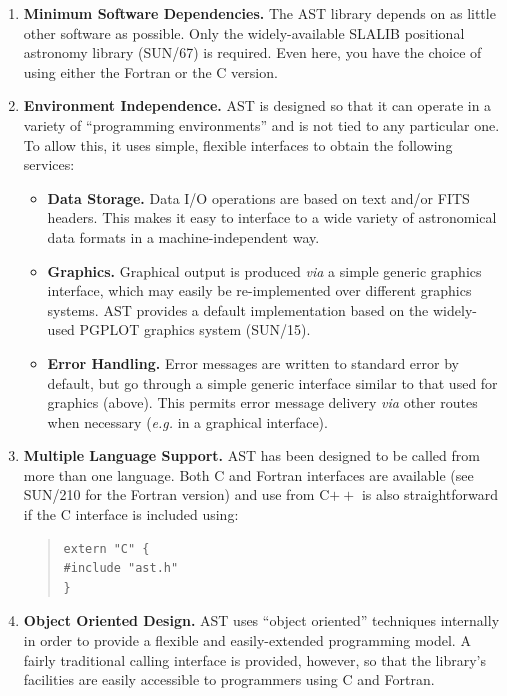 \documentclass[twoside,11pt]{article}
\newcommand{\xref}[3]{#1}
\begin{document}
\begin{enumerate}
\item {\bf{Minimum Software Dependencies.}}
The AST library depends on as little other software as possible. Only
the widely-available SLALIB positional astronomy library
(\xref{SUN/67}{sun67}{}) is required. Even here, you have the choice
of using either the Fortran or the C version.

\item {\bf{Environment Independence.}}
AST is designed so that it can operate in a variety of ``programming
environments'' and is not tied to any particular one. To allow this,
it uses simple, flexible interfaces to obtain the following services:

\begin{itemize}
\item {\bf{Data Storage.}} Data I/O operations are based on text
and/or FITS headers. This makes it easy to interface to a wide variety
of astronomical data formats in a machine-independent way.

\item {\bf{Graphics.}} Graphical output is produced {\em{via}} a
simple generic graphics interface, which may easily be re-implemented
over different graphics systems. AST provides a default implementation
based on the widely-used PGPLOT graphics system
(\xref{SUN/15}{sun15}{}).

\item {\bf{Error Handling.}} Error messages are written to standard
error by default, but go through a simple generic interface similar to
that used for graphics (above). This permits error message delivery
{\em{via}} other routes when necessary ({\em{e.g.}} in a graphical
interface).
\end{itemize}

\item {\bf{Multiple Language Support.}}
AST has been designed to be called from more than one language.
Both C and Fortran interfaces are available (see
\xref{SUN/210}{sun210}{} for the Fortran version)
and use from C$++$ is also straightforward if the C interface is
included using:

\begin{quote}
\small
\begin{verbatim}
extern "C" {
#include "ast.h"
}
\end{verbatim}
\normalsize
\end{quote}

\item {\bf{Ob\mbox{}ject Oriented Design.}}
AST uses ``object oriented'' techniques internally in order to provide
a flexible and easily-extended programming model.  A fairly
traditional calling interface is provided, however, so that the
library's facilities are easily accessible to programmers using
C and Fortran.


\end{enumerate}
\end{document}
